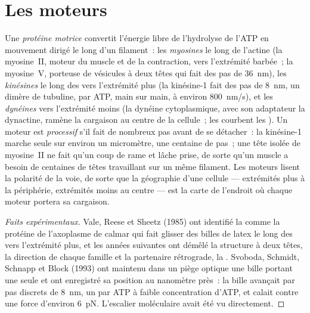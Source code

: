 \section{Les moteurs}

\begin{definition}\label{def:b3:cytoskeleton-motility:motors}
Une \emph{protéine motrice} convertit l'énergie libre de l'hydrolyse de
l'ATP en mouvement dirigé le long d'un filament~: les \emph{myosines}
le long de l'actine (la myosine~II, moteur du muscle et de la
contraction, vers l'extrémité barbée~; la myosine~V, porteuse de
vésicules à deux têtes qui fait des pas de \qty{36}{nm}), les
\emph{kinésines} le long des  vers l'extrémité plus (la
kinésine-1 fait des pas de \qty{8}{nm}, un dimère de tubuline, par ATP,
main sur main, à environ \qty{800}{nm/s}), et les \emph{dynéines} vers
l'extrémité moins (la dynéine cytoplasmique, avec son adaptateur la
dynactine, ramène la cargaison au centre de la cellule~; les  courbent les ). Un moteur est \emph{processif} s'il fait
de nombreux pas avant de se détacher~: la kinésine-1 marche seule sur
environ un micromètre, une centaine de pas~; une tête isolée de
myosine~II ne fait qu'un coup de rame et lâche prise, de sorte qu'un
muscle a besoin de centaines de têtes travaillant sur un même filament.
Les moteurs lisent la polarité de la voie, de sorte que la géographie
d'une cellule --- extrémités plus à la périphérie, extrémités moins au
centre --- est la carte de l'endroit où chaque moteur portera sa
cargaison.
\end{definition}

\begin{proof}[Faits expérimentaux]
Vale, Reese et Sheetz (1985) ont identifié la  comme la
protéine de l'axoplasme de calmar qui fait glisser des billes de latex
le long des  vers l'extrémité plus, et les années suivantes
ont démêlé la structure à deux têtes, la direction de chaque famille et
la partenaire rétrograde, la . Svoboda, Schmidt, Schnapp et
Block (1993) ont maintenu dans un piège optique une bille portant une
seule  et ont enregistré sa position au nanomètre près~: la
bille avançait par pas discrets de \qty{8}{nm}, un par ATP à faible
concentration d'ATP, et calait contre une force d'environ \qty{6}{pN}.
L'escalier moléculaire avait été vu directement.
\end{proof}

